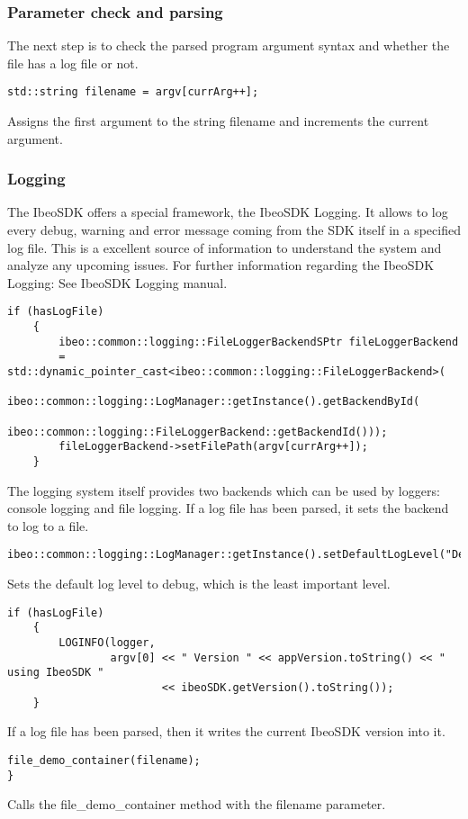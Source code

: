 \subsubsection{Parameter check and parsing}
The next step is to check the parsed program argument syntax and whether the file has a log file or not.
\begin{lstlisting}[firstnumber=last]
    std::string filename = argv[currArg++];
\end{lstlisting}
Assigns the first argument to the string filename and increments the current argument.
\subsubsection{Logging}
The IbeoSDK offers a special framework, the IbeoSDK Logging. It allows to log every debug, warning and error message coming from the SDK itself in a specified log file. This is a excellent source of information to understand the system and analyze any upcoming issues. For further information regarding the IbeoSDK Logging: See IbeoSDK Logging manual.\\
\begin{lstlisting}[firstnumber=last]
    if (hasLogFile)
    {
    	ibeo::common::logging::FileLoggerBackendSPtr fileLoggerBackend
    	= std::dynamic_pointer_cast<ibeo::common::logging::FileLoggerBackend>(
    		ibeo::common::logging::LogManager::getInstance().getBackendById(
    			ibeo::common::logging::FileLoggerBackend::getBackendId()));
    	fileLoggerBackend->setFilePath(argv[currArg++]);
    }
\end{lstlisting}
The logging system itself provides two backends which can be used by loggers: console logging and file logging. If a log file has been parsed, it sets the backend to log to a file.
\begin{lstlisting}[firstnumber=last]
    ibeo::common::logging::LogManager::getInstance().setDefaultLogLevel("Debug");
\end{lstlisting}
Sets the default log level to debug, which is the least important level.
\begin{lstlisting}[firstnumber=last]
    if (hasLogFile)
    {
    	LOGINFO(logger,
                argv[0] << " Version " << appVersion.toString() << "  using IbeoSDK " 
                		<< ibeoSDK.getVersion().toString());
    }
\end{lstlisting}
If a log file has been parsed, then it writes the current IbeoSDK version into it. 
\begin{lstlisting}[firstnumber=last]
    file_demo_container(filename);
}	
\end{lstlisting}
Calls the file\_demo\_container method with the filename parameter.
